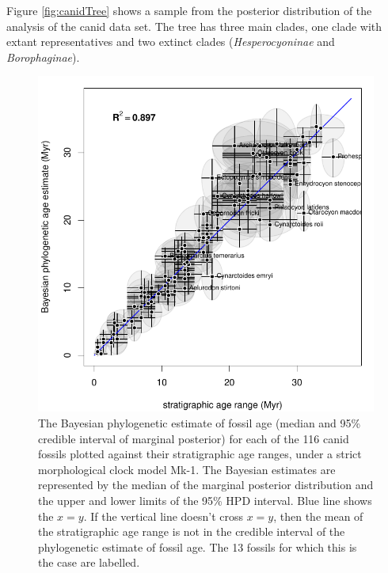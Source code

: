 \documentclass[11pt]{article}
\newcommand{\Mstrict}{{Mk-1}}
\newcommand{\ncanidfossils}{{116}}
\begin{document}
Figure \ref{fig:canidTree} shows a sample from the posterior distribution of the analysis of the canid data set. The tree has three main clades, one clade with extant representatives and two extinct clades ({\it Hesperocyoninae} and {\it Borophaginae}). 

\begin{figure}
\includegraphics{canids/stratRanges/1c_phyloAgeVsGeoAge.pdf}
\caption{\label{fig:canidMorphVsGeo}
The Bayesian phylogenetic estimate of fossil age (median and 95\% credible interval of marginal posterior) for each of the \ncanidfossils{} canid fossils plotted against their stratigraphic age ranges, under a strict morphological clock model \Mstrict{}. 
The Bayesian estimates are represented by the median of the marginal posterior distribution and the upper and lower limits of the 95\% HPD interval. Blue line shows the $x=y$. 
If the vertical line doesn't cross $x=y$, then the mean of the stratigraphic age range is not in the credible interval of the phylogenetic estimate of fossil age. The 13 fossils for which this is the case are labelled.}
\end{figure}
\end{document}

